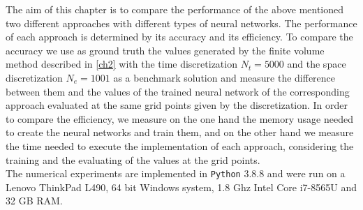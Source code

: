 The aim of this chapter is to compare the performance of the above mentioned two different approaches with different types of neural networks. The performance of each approach is determined by its accuracy and its efficiency. To compare the accuracy we use as ground truth the values generated by the finite volume method described in \cref{ch2} with the time discretization $N_t = 5000$ and the space discretization $N_e = 1001$ as a benchmark solution and measure the difference between them and the values of the trained neural network of the corresponding approach evaluated at the same grid points given by the discretization. In order to compare the efficiency, we measure on the one hand the memory usage needed to create the neural networks and train them, and on the other hand we measure the time needed to execute the implementation of each approach, considering the training and the evaluating of the values at the grid points. \\
The numerical experiments are implemented in \lstinline!Python! 3.8.8 and were run on a Lenovo ThinkPad L490, 64 bit Windows system, 1.8 Ghz Intel Core i7-8565U and 32 GB RAM.



